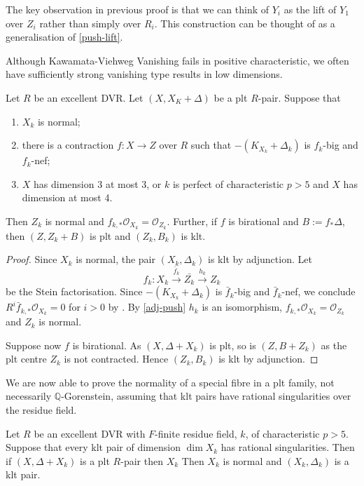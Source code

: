 \documentclass[a4paper,12pt]{book}
\newcommand{\ox}[1][X]{\mathcal{O}_{#1}}
\begin{document}
\begin{remark}
	The key observation in previous proof is that we can think of $Y_{i}$ as the lift of $Y_{1}$ over $Z_{i}$ rather than simply over $R_{i}$. This construction can be thought of as a generalisation of \autoref{push-lift}.
\end{remark}

Although Kawamata-Viehweg Vanishing fails in positive characteristic, we often have sufficiently strong vanishing type results in low dimensions.

\begin{lemma}\label{invAdj2}
	Let $R$ be an excellent DVR.
	Let $(X,X_{K}+\Delta)$ be a plt $R$-pair. Suppose that
	\begin{enumerate}
		\item $X_k$ is normal;
		\item there is a contraction $f \colon X \to Z$ over $R$ such that $-(K_{X_{k}}+\Delta_{k})$ is $f_{k}$-big and $f_k$-nef;
		\item $X$ has dimension $3$ at most 3, or $k$ is perfect of characteristic $p>5$ and $X$ has dimension at most 4.
	\end{enumerate}  
	Then $Z_{k}$ is normal and $f_{k,*}\ox[X_{k}]=\ox[Z_{k}]$. Further, if $f$ is birational and $B:=f_{*}\Delta$, then $(Z, Z_k+B)$ is plt and $(Z_{k},B_{k})$ is klt.
\end{lemma}

\begin{proof}
	Since $X_{k}$ is normal, the pair $(X_{k},\Delta_{k})$ is klt by adjunction. 
	Let $$f_{k}\colon X_{k} \xrightarrow{\bar{f}_{k}} \bar{Z_k} \xrightarrow{h_k} Z_{k}$$ be the Stein factorisation. 
	Since $-(K_{X_{k}}+\Delta_{k})$ is $\bar{f}_{k}$-big and $\bar{f}_{k}$-nef, we conclude $R^{i}\bar{f}_{k,*}\ox[X_{k}]=0$ for $i> 0$ by \cite[Proposition 3.2]{tanaka2018minimal}.
	By \autoref{adj-push} $h_k$ is an isomorphism, $f_{k,*}\ox[X_{k}]=\ox[Z_{k}]$ and $Z_{k}$ is normal.
	
	Suppose now $f$ is birational. As $(X,\Delta+X_k)$ is plt, so is $(Z,B+Z_k)$ as the plt centre $Z_k$ is not contracted. Hence $(Z_k,B_k)$ is klt by adjunction.			
\end{proof}

We are now able to prove the normality of a special fibre in a plt family, not necessarily $\mathbb{Q}$-Gorenstein, assuming that klt pairs have rational singularities over the residue field.

\begin{theorem}
	Let $R$ be an excellent DVR with $F$-finite residue field, $k$, of characteristic $p> 5$. Suppose that every klt pair of dimension $\dim X_{k}$ has rational singularities. Then if $(X,\Delta+X_{k})$ is a plt $R$-pair then $X_{k}$ Then $X_{k}$ is normal and $(X_{k}, \Delta_{k})$ is a klt pair.
\end{theorem}
\end{document}
